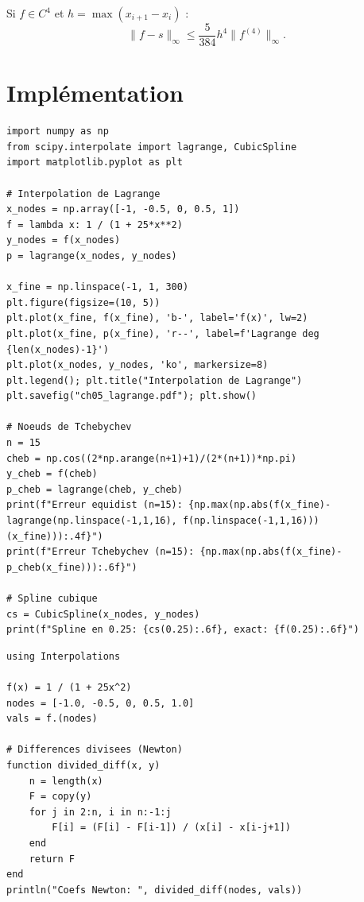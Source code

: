 \begin{theoreme}
Si $f\in C^4$ et $h=\max(x_{i+1}-x_i)$ :
\[
\|f-s\|_\infty \leq \frac{5}{384}h^4\|f^{(4)}\|_\infty.
\]
\end{theoreme}

\section{Impl\'ementation}

\begin{codeblock}[title=\textbf{Python}]
\begin{verbatim}
import numpy as np
from scipy.interpolate import lagrange, CubicSpline
import matplotlib.pyplot as plt

# Interpolation de Lagrange
x_nodes = np.array([-1, -0.5, 0, 0.5, 1])
f = lambda x: 1 / (1 + 25*x**2)
y_nodes = f(x_nodes)
p = lagrange(x_nodes, y_nodes)

x_fine = np.linspace(-1, 1, 300)
plt.figure(figsize=(10, 5))
plt.plot(x_fine, f(x_fine), 'b-', label='f(x)', lw=2)
plt.plot(x_fine, p(x_fine), 'r--', label=f'Lagrange deg {len(x_nodes)-1}')
plt.plot(x_nodes, y_nodes, 'ko', markersize=8)
plt.legend(); plt.title("Interpolation de Lagrange")
plt.savefig("ch05_lagrange.pdf"); plt.show()

# Noeuds de Tchebychev
n = 15
cheb = np.cos((2*np.arange(n+1)+1)/(2*(n+1))*np.pi)
y_cheb = f(cheb)
p_cheb = lagrange(cheb, y_cheb)
print(f"Erreur equidist (n=15): {np.max(np.abs(f(x_fine)-lagrange(np.linspace(-1,1,16), f(np.linspace(-1,1,16)))(x_fine))):.4f}")
print(f"Erreur Tchebychev (n=15): {np.max(np.abs(f(x_fine)-p_cheb(x_fine))):.6f}")

# Spline cubique
cs = CubicSpline(x_nodes, y_nodes)
print(f"Spline en 0.25: {cs(0.25):.6f}, exact: {f(0.25):.6f}")
\end{verbatim}
\end{codeblock}

\begin{codeblock}[title=\textbf{Julia}]
\begin{verbatim}
using Interpolations

f(x) = 1 / (1 + 25x^2)
nodes = [-1.0, -0.5, 0, 0.5, 1.0]
vals = f.(nodes)

# Differences divisees (Newton)
function divided_diff(x, y)
    n = length(x)
    F = copy(y)
    for j in 2:n, i in n:-1:j
        F[i] = (F[i] - F[i-1]) / (x[i] - x[i-j+1])
    end
    return F
end
println("Coefs Newton: ", divided_diff(nodes, vals))
\end{verbatim}
\end{codeblock}

